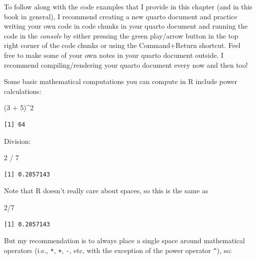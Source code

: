 \documentclass[
  letterpaper,
  DIV=11,
  numbers=noendperiod]{scrreprt}
\newenvironment{Shaded}{\begin{snugshade}}{\end{snugshade}}
\newcommand{\DecValTok}[1]{\textcolor[rgb]{0.68,0.00,0.00}{#1}}
\newcommand{\NormalTok}[1]{\textcolor[rgb]{0.00,0.23,0.31}{#1}}
\newcommand{\SpecialCharTok}[1]{\textcolor[rgb]{0.37,0.37,0.37}{#1}}
\begin{document}
To follow along with the code examples that I provide in this chapter
(and in this book in general), I recommend creating a new quarto
document and practice writing your own code in code chunks in your
quarto document and running the code in the \emph{console} by either
pressing the green play/arrow button in the top right corner of the code
chunks or using the Command+Return shortcut. Feel free to make some of
your own notes in your quarto document outside. I recommend
compiling/rendering your quarto document every now and then too!

Some basic mathematical computations you can compute in R include power
calculations:

\begin{Shaded}
\begin{Highlighting}[]
\NormalTok{(}\DecValTok{3} \SpecialCharTok{+} \DecValTok{5}\NormalTok{)}\SpecialCharTok{\^{}}\DecValTok{2}
\end{Highlighting}
\end{Shaded}

\begin{verbatim}
[1] 64
\end{verbatim}

Division:

\begin{Shaded}
\begin{Highlighting}[]
\DecValTok{2} \SpecialCharTok{/} \DecValTok{7}
\end{Highlighting}
\end{Shaded}

\begin{verbatim}
[1] 0.2857143
\end{verbatim}

Note that R doesn't really care about spaces, so this is the same as

\begin{Shaded}
\begin{Highlighting}[]
\DecValTok{2}\SpecialCharTok{/}\DecValTok{7}
\end{Highlighting}
\end{Shaded}

\begin{verbatim}
[1] 0.2857143
\end{verbatim}

But my recommendation is to always place a single space around
mathematical operators (i.e., \texttt{*}, \texttt{+}, \texttt{-}, etc,
with the exception of the power operator \texttt{\^{}}), so:
\end{document}
